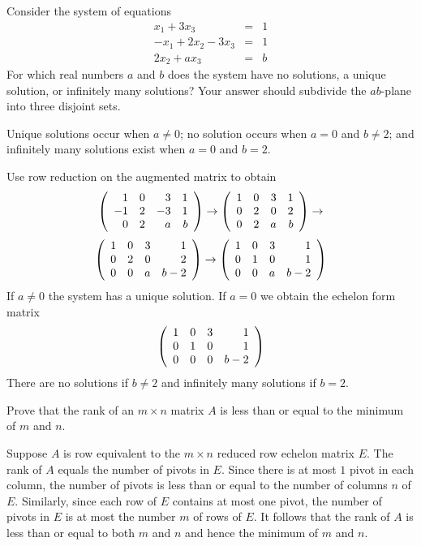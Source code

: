 \documentclass{ximera}
\begin{document}
\begin{exercise}\label{c2.4.2b.2}

Consider the system of equations
\[
\begin{array}{rcl}
x_1 + 3x_3 & = & 1 \\
-x_1+2x_2-3x_3 & = & 1\\
2x_2 + ax_3 & = & b
\end{array}
\]
For which real numbers $a$ and $b$ does the system have no solutions, a unique solution, or infinitely many solutions?  Your answer should subdivide the $ab$-plane into three disjoint sets.
  
\begin{solution}

\ans Unique solutions occur when $a\neq 0$; no solution occurs when $a=0$ and $b\neq 2$; and infinitely many solutions exist when $a = 0$ and $b =2$.

\soln 
Use row reduction on the augmented matrix to obtain
\[
\left(\begin{array}{rrrrrrrrrrrrrrrrrr} 1 & 0 & 3 & 1\\ -1 & 2 & -3 & 1 \\ 0 & 2 & a & b \end{array}\right) \to
\left(\begin{array}{rrrrrrrrrrrrrrrrrr} 1 & 0 & 3 & 1\\  0 & 2 & 0 & 2 \\ 0 & 2 & a & b \end{array}\right) \to
\]
\[
\left(\begin{array}{rrrrrrrrrrrrrrrrrr} 1 & 0 & 3 & 1\\  0 & 2 & 0 & 2 \\ 0 & 0 & a & b - 2 \end{array}\right) \to
\left(\begin{array}{rrrrrrrrrrrrrrrrrr} 1 & 0 & 3 & 1\\  0 & 1 & 0 & 1 \\ 0 & 0 & a & b - 2 \end{array}\right) 
\]
If $a\neq 0$ the system has a unique solution. If $a = 0$ we obtain the echelon form matrix
\[
\left(\begin{array}{rrrrrrrrrrrrrrrrrr} 1 & 0 & 3 & 1\\  0 & 1 & 0 & 1 \\ 0 & 0 & 0 & b - 2 \end{array}\right)
\]  
There are no solutions if $b\neq 2$ and infinitely many solutions if $b = 2$.

\end{solution}
\end{exercise}

\problemlabel

\begin{exercise} \label{A:2.4.1}
  Prove that the rank of an $m \times n$ matrix $A$ is less than or equal to
  the minimum of $m$ and $n$.

\begin{solution}
Suppose $A$ is row equivalent to the $m \times n$ reduced row echelon matrix $E$.  The rank of $A$ equals the number of pivots in $E$. Since there is at most $1$ pivot in each column, the number of pivots is less than or equal to the number of columns $n$ of $E$.  Similarly, since each row of $E$ contains at most one pivot, the number of pivots in $E$ is at most the number $m$ of rows of $E$.  It follows that the rank of $A$ is less than or equal to both $m$ and $n$ and hence the minimum of $m$ and $n$.  
\end{solution}
\end{exercise}
\end{document}
